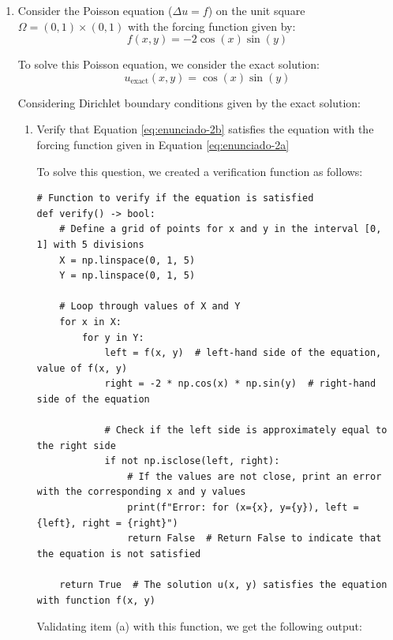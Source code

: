\documentclass[aps,amsmath,amssymb,floatfix]{revtex4}
\begin{document}
\begin{enumerate}
	\item Consider the Poisson equation ($\Delta u = f$) on the unit square $\Omega = (0, 1) \times (0, 1)$ with the forcing function given by:
	      \begin{equation}
	      	f(x, y) = -2 \cos(x) \sin(y)
	      	\label{eq:enunciado-2a}
	      \end{equation}
	      
	      To solve this Poisson equation, we consider the exact solution:
	      \begin{equation}
	      	u_{\text{exact}}(x,y) = \cos(x)\sin(y)
	      	\label{eq:enunciado-2b}
	      \end{equation}
	      
	      Considering Dirichlet boundary conditions given by the exact solution:
	      \begin{enumerate}
	      	\item Verify that Equation \eqref{eq:enunciado-2b} satisfies the equation with the forcing function given in Equation \eqref{eq:enunciado-2a}
	      	      
	      	      To solve this question, we created a verification function as follows:
	      	      

	      	      \begin{lstlisting}
# Function to verify if the equation is satisfied
def verify() -> bool:
    # Define a grid of points for x and y in the interval [0, 1] with 5 divisions
    X = np.linspace(0, 1, 5)
    Y = np.linspace(0, 1, 5)
    
    # Loop through values of X and Y
    for x in X:  
        for y in Y:  
            left = f(x, y)  # left-hand side of the equation, value of f(x, y)
            right = -2 * np.cos(x) * np.sin(y)  # right-hand side of the equation

            # Check if the left side is approximately equal to the right side
            if not np.isclose(left, right):
                # If the values are not close, print an error with the corresponding x and y values
                print(f"Error: for (x={x}, y={y}), left = {left}, right = {right}")
                return False  # Return False to indicate that the equation is not satisfied
    
    return True  # The solution u(x, y) satisfies the equation with function f(x, y)
	      	      \end{lstlisting}
	      	      
	      	      Validating item (a) with this function, we get the following output:
	      	      

\end{enumerate}
\end{enumerate}
\end{document}
